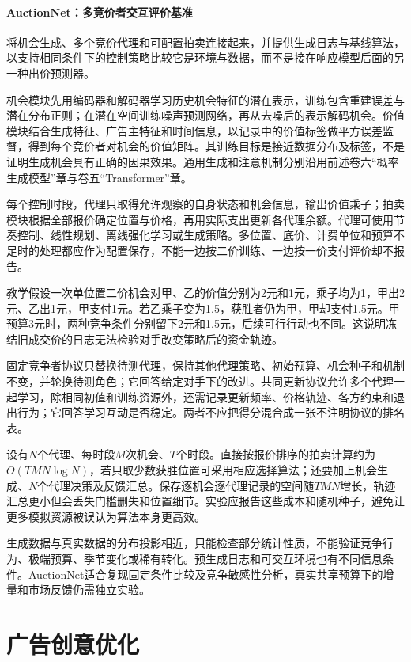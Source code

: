 \paragraph{AuctionNet：多竞价者交互评价基准}
\label{sec:rs-advertising-auctionnet}

将机会生成、多个竞价代理和可配置拍卖连接起来，并提供生成日志与基线算法，以支持相同条件下的控制策略比较它是环境与数据，而不是接在响应模型后面的另一种出价预测器。

机会模块先用编码器和解码器学习历史机会特征的潜在表示，训练包含重建误差与潜在分布正则；在潜在空间训练噪声预测网络，再从去噪后的表示解码机会。价值模块结合生成特征、广告主特征和时间信息，以记录中的价值标签做平方误差监督，得到每个竞价者对机会的价值矩阵。其训练目标是接近数据分布及标签，不是证明生成机会具有正确的因果效果。通用生成和注意机制分别沿用前述卷六“概率生成模型”章与卷五“Transformer”章。

每个控制时段，代理只取得允许观察的自身状态和机会信息，输出价值乘子；拍卖模块根据全部报价确定位置与价格，再用实际支出更新各代理余额。代理可使用节奏控制、线性规划、离线强化学习或生成策略。多位置、底价、计费单位和预算不足时的处理都应作为配置保存，不能一边按二价训练、一边按一价支付评价却不报告。

教学假设一次单位置二价机会对甲、乙的价值分别为2元和1元，乘子均为1，甲出2元、乙出1元，甲支付1元。若乙乘子变为1.5，获胜者仍为甲，甲却支付1.5元。甲预算3元时，两种竞争条件分别留下2元和1.5元，后续可行行动也不同。这说明冻结旧成交价的日志无法检验对手改变策略后的资金轨迹。

固定竞争者协议只替换待测代理，保持其他代理策略、初始预算、机会种子和机制不变，并轮换待测角色；它回答给定对手下的改进。共同更新协议允许多个代理一起学习，除相同初值和训练资源外，还需记录更新频率、价格轨迹、各方约束和退出行为；它回答学习互动是否稳定。两者不应把得分混合成一张不注明协议的排名表。

设有$N$个代理、每时段$M$次机会、$T$个时段。直接按报价排序的拍卖计算约为$O(TMN\log N)$，若只取少数获胜位置可采用相应选择算法；还要加上机会生成、$N$个代理决策及反馈汇总。保存逐机会逐代理记录的空间随$TMN$增长，轨迹汇总更小但会丢失门槛删失和位置细节。实验应报告这些成本和随机种子，避免让更多模拟资源被误认为算法本身更高效。

生成数据与真实数据的分布投影相近，只能检查部分统计性质，不能验证竞争行为、极端预算、季节变化或稀有转化。预生成日志和可交互环境也有不同信息条件。AuctionNet适合复现固定条件比较及竞争敏感性分析，真实共享预算下的增量和市场反馈仍需独立实验。

\section{广告创意优化}
\label{sec:rs-advertising-creative}

